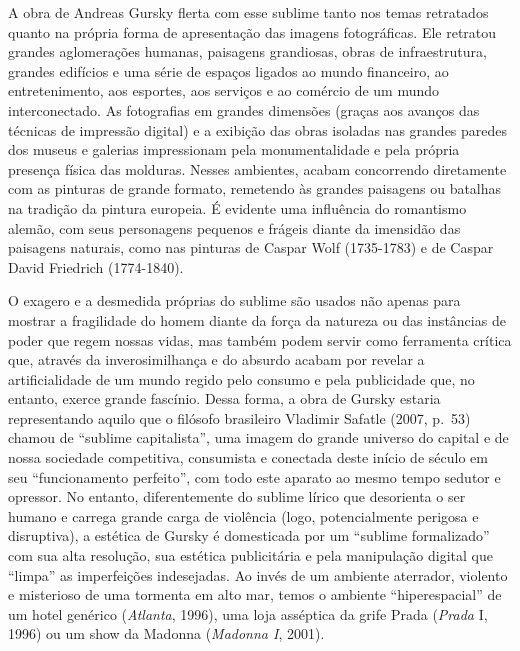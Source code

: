 A obra de Andreas Gursky flerta com esse sublime tanto nos temas
retratados quanto na própria forma de apresentação das imagens
fotográficas. Ele retratou grandes aglomerações humanas, paisagens
grandiosas, obras de infraestrutura, grandes edifícios e uma série de
espaços ligados ao mundo financeiro, ao entretenimento, aos esportes,
aos serviços e ao comércio de um mundo interconectado. As fotografias em
grandes dimensões (graças aos avanços das técnicas de impressão digital)
e a exibição das obras isoladas nas grandes paredes dos museus e
galerias impressionam pela monumentalidade e pela própria presença
física das molduras. Nesses ambientes, acabam concorrendo diretamente
com as pinturas de grande formato, remetendo às grandes paisagens ou
batalhas na tradição da pintura europeia. É evidente uma influência do
romantismo alemão, com seus personagens pequenos e frágeis diante da
imensidão das paisagens naturais, como nas pinturas de Caspar Wolf (1735-1783) e de Caspar David Friedrich (1774-1840).

O exagero e a desmedida próprias do sublime são usados não apenas para
mostrar a fragilidade do homem diante da força da natureza ou das
instâncias de poder que regem nossas vidas, mas também podem servir como
ferramenta crítica que, através da inverosimilhança e do absurdo acabam
por revelar a artificialidade de um mundo regido pelo consumo e pela
publicidade que, no entanto, exerce grande fascínio. Dessa forma, a obra
de Gursky estaria representando aquilo que o filósofo brasileiro
Vladimir Safatle (2007, p.~53) chamou de ``sublime capitalista'', uma
imagem do grande universo do capital e de nossa sociedade competitiva,
consumista e conectada deste início de século  em seu ``funcionamento
perfeito'', com todo este aparato ao mesmo tempo sedutor e opressor. No
entanto, diferentemente do sublime lírico que desorienta o ser humano e
carrega grande carga de violência (logo, potencialmente perigosa e
disruptiva), a estética de Gursky é domesticada por um ``sublime
formalizado'' com sua alta resolução, sua estética publicitária e pela
manipulação digital que ``limpa'' as imperfeições indesejadas. Ao invés
de um ambiente aterrador, violento e misterioso de uma tormenta em alto
mar, temos o ambiente ``hiperespacial'' de um hotel genérico
(\emph{Atlanta}, 1996), uma loja asséptica da grife Prada (\emph{Prada}
I, 1996) ou um show da Madonna (\emph{Madonna I}, 2001).


